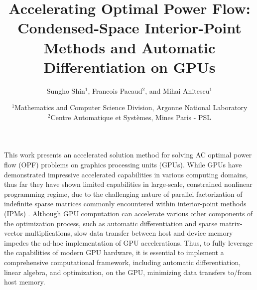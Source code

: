  
\title{\Large Accelerating Optimal Power Flow: Condensed-Space Interior-Point Methods and Automatic Differentiation on GPUs}

\author{Sungho Shin$^{1}$, Francois Pacaud$^2$, and Mihai Anitescu$^{1}$}
\date{\small
  $^{1}$Mathematics and Computer Science Division, Argonne National Laboratory\\
  $^{2}$Centre Automatique et Syst\`{e}mes, Mines Paris - PSL
}

\maketitle
\thispagestyle{empty}


This work presents an accelerated solution method for solving AC optimal power flow (OPF) problems on graphics processing units (GPUs). While GPUs have demonstrated impressive accelerated capabilities in various computing domains, thus far they have shown limited capabilities in large-scale, constrained nonlinear programming regime, due to the challenging nature of parallel factorization of indefinite sparse matrices commonly encountered within interior-point methods (IPMs) \cite{anitescu2021targeting}. Although GPU computation can accelerate various other components of the optimization process, such as automatic differentiation and sparse matrix-vector multiplications, slow data transfer between host and device memory impedes the ad-hoc implementation of GPU accelerations. Thus, to fully leverage the capabilities of modern GPU hardware, it is essential to implement a comprehensive computational framework, including automatic differentiation, linear algebra, and optimization, on the GPU, minimizing data transfers to/from host memory.

